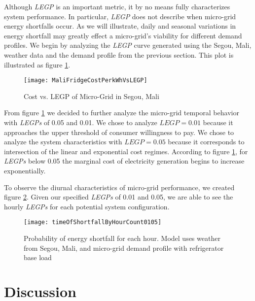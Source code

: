 \documentclass{article}
\begin{document}

Although \emph{LEGP} is an important metric, it by no means fully characterizes system performance. 
In particular, \emph{LEGP} does not describe when micro-grid energy shortfalls occur.
As we will illustrate, daily and seasonal variations in energy shortfall may greatly effect a micro-grid's viability for different demand profiles. 
We begin by analyzing the \emph{LEGP} curve generated using the Segou, Mali, weather data and the demand profile from the previous section. 
This plot is illustrated as figure \ref{CostVLEGPMali}.

\begin{figure}[ht]  
  \centering
    \texttt{[image: MaliFridgeCostPerkWhVsLEGP]}
  \caption{Cost vs. LEGP of Micro-Grid in Segou, Mali}
  \label{CostVLEGPMali}
\end{figure}

From figure \ref{CostVLEGPMali} we decided to further analyze the micro-grid temporal behavior with \emph{LEGPs} of 0.05 and 0.01.
 We chose to analyze $LEGP = 0.01$ because it approaches the upper threshold of consumer willingness to pay.
We chose to analyze the system characteristics with $LEGP = 0.05$ because it corresponds to intersection of the linear and exponential cost regimes.
According to figure \ref{CostVLEGPMali}, for \emph{LEGPs} below 0.05 the marginal cost of electricity generation begins to increase exponentially.  

To observe the diurnal characteristics of micro-grid performance, we created figure \ref{hourlyLEGP}. Given our specified \emph{LEGPs} of 0.01 and 0.05, we are able to see the hourly \emph{LEGPs} for each potential system configuration.

\begin{figure}[ht]
\centering
\texttt{[image: timeOfShortfallByHourCount0105]}
\caption{Probability of energy shortfall for each hour. Model uses weather from Segou, Mali, and micro-grid demand profile with refrigerator base load}
\label{hourlyLEGP}
\end{figure} 








\section{Discussion}
\end{document}

